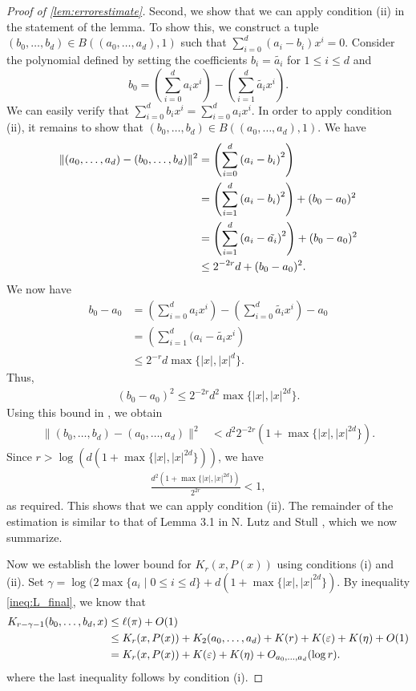 \documentclass[a4paper,UKenglish,cleveref,autoref,thm-restate]{lipics-v2021}
\begin{document}
\begin{proof}[Proof of \cref{lem:errorestimate}]
	
	Second, we show that we can apply condition (ii) in the statement of
	the lemma. To show this, we construct a tuple $\left(b_0,\dots,b_d\right)\in B\left(\left(a_0,\dots,a_d\right),1\right)$ such that
	$\sum_{i=0}^d\left(a_i-b_i\right)x^i=0$. Consider the polynomial defined by setting
	the coefficients $b_i=\tilde{a_i}$ for $1 \le i \le d$ and
	$$b_0 =
	\left(\sum_{i=0}^da_ix^i\right)-\left(\sum_{i=1}^d
	\tilde{a_i}x^i\right).$$ We can easily verify that
	$\sum_{i=0}^d b_i x^i = \sum_{i=0}^d a_ix^i$. In order to apply
	condition (ii), it remains to show that
	$(b_0,\dots,b_d)\in B\left((a_0,\dots,a_d),1\right)$. We have
	\begin{align}
		\notag
		\|(a_0,\dots,a_d)-(b_0,\dots,b_d)\|^2
		&=\left(\sum_{i=0}^d \left(a_i-b_i\right)^2\right)\\
		\notag
		&=\left(\sum_{i=1}^d \left(a_i-b_i\right)^2\right)+
		(b_0-a_0)^2\\
		\notag
		&=\left(\sum_{i=1}^d \left(a_i-\tilde{a_i}\right)^2\right)+
		(b_0-a_0)^2\\
		\label{ineq:L2_difference}
		&\le2^{-2r}d+(b_0-a_0)^2.
	\end{align}
	We now have
	\begin{align*}
		b_0-a_0 
		&=\left(\sum_{i=0}^d a_i x^i\right)-
		\left(\sum_{i=0}^d \tilde{a_i} x^i\right)-a_0\\
		&=\left(\sum_{i=1}^d(a_i-\tilde{a_i} x^i\right)\\
		&\le2^{-r}d \max\{|x|,|x|^d\}.
	\end{align*}
	Thus,
	\begin{align*}
		(b_0-a_0)^2 \le 2^{-2r}d^2\max\{|x|,|x|^{2d}\}.
	\end{align*}
	Using this bound in , we obtain
	\begin{align}
		\label{ineq:L_final}
		\|(b_0,\dots,b_d)-(a_0,\dots,a_d)\|^2
		&<d^2 2^{-2r} \left(1+\max \{|x|,|x|^{2d}\}\right).
	\end{align}
	Since $r>\log ( d(1+\max\{|x|,|x|^{2d}\}) )$, we have 
	\begin{align*}
		\frac{d^2(1+\max\{|x|,|x|^{2d}\})}{2^{2r}} < 1,
	\end{align*}
	as required. This shows that we can apply condition (ii). The
	remainder of the estimation is similar to that of Lemma 3.1 in N. Lutz
	and Stull \cite{Lutz2020e}, which we now summarize.
	
	Now we establish the lower bound for $K_r(x,P(x))$ using conditions
	(i) and (ii). Set $\gamma=\log(2\max\{a_i\mid 0\le i\le d\} +
	d(1+\max\{|x|,|x|^{2d}\})$. By inequality \eqref{ineq:L_final}, we know that
	\begin{align}
		\notag
		K_{r-\gamma-1}(b_0,\dots,b_d,x) 
		&\le \ell(\pi)+O(1)\\
		\notag
		&\le K_r(x,P(x))+K_2(a_0,\dots,a_d)+K(r)+K(\varepsilon)+K(\eta)+O(1)\\
		\label{ineq:lb_x_Px_final}
		&=
		K_r(x,P(x))+K(\varepsilon)+K(\eta)+O_{a_0,\dots,a_d}(\log r).
	\end{align}
	where the last inequality follows by condition (i). 
	

\end{proof}
\end{document}
